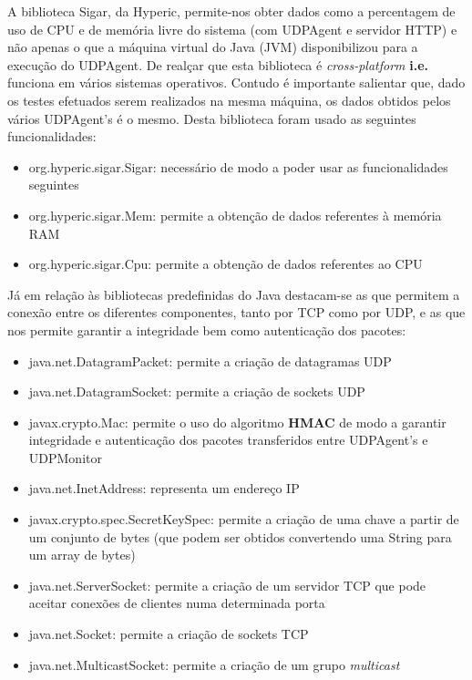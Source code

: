\documentclass{article}
\begin{document}
A biblioteca Sigar, da Hyperic, permite-nos obter dados como a percentagem de uso de CPU e de memória livre do sistema (com UDPAgent e servidor HTTP) e não apenas o que a máquina virtual do Java (JVM) disponibilizou para a execução do UDPAgent. De realçar que esta biblioteca é \textit{cross-platform} \textbf{i.e.} funciona em vários sistemas operativos. Contudo é importante salientar que, dado os testes efetuados serem realizados na mesma máquina, os dados obtidos pelos vários UDPAgent's é o mesmo. Desta biblioteca foram usado as seguintes funcionalidades:
\begin{itemize}
	\item org.hyperic.sigar.Sigar: necessário de modo a poder usar as funcionalidades seguintes
	\item org.hyperic.sigar.Mem: permite a obtenção de dados referentes à memória RAM
	\item org.hyperic.sigar.Cpu: permite a obtenção de dados referentes ao CPU
\end{itemize}
Já em relação às bibliotecas predefinidas do Java destacam-se as que permitem a conexão entre os diferentes componentes, tanto por TCP como por UDP, e as que nos permite garantir a integridade bem como autenticação dos pacotes:
\begin{itemize}
	\item java.net.DatagramPacket: permite a criação de datagramas UDP
  	\item java.net.DatagramSocket: permite a criação de sockets UDP
    \item javax.crypto.Mac: permite o uso do algoritmo \textbf{HMAC} de modo a garantir integridade e autenticação dos pacotes transferidos entre UDPAgent's e UDPMonitor
    \item java.net.InetAddress: representa um endereço IP
    \item javax.crypto.spec.SecretKeySpec: permite a criação de uma chave a partir de um conjunto de bytes (que podem ser obtidos convertendo uma String para um array de bytes)
    \item java.net.ServerSocket: permite a criação de um servidor TCP que pode aceitar conexões de clientes numa determinada porta
	\item java.net.Socket: permite a criação de sockets TCP
    \item java.net.MulticastSocket: permite a criação de um grupo \textit{multicast}
\end{itemize}
\end{document}
